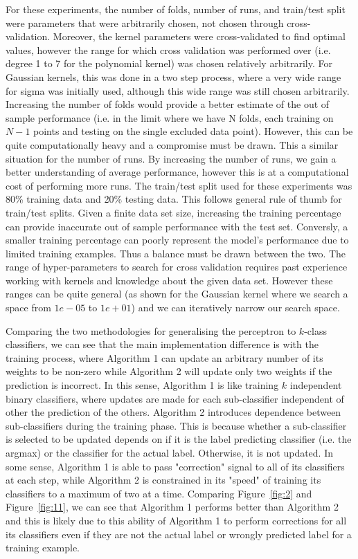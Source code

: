 \documentclass[12pt]{article}
\begin{document}
For these experiments, the number of folds, number of runs, and train/test split were parameters that were arbitrarily chosen, not chosen through cross-validation. Moreover, the kernel parameters were cross-validated to find optimal values, however the range for which cross validation was performed over (i.e. degree 1 to 7 for the polynomial kernel) was chosen relatively arbitrarily. For Gaussian kernels, this was done in a two step process, where a very wide range for sigma was initially used, although this wide range was still chosen arbitrarily. Increasing the number of folds would provide a better estimate of the out of sample performance (i.e. in the limit where we have N folds, each training on $N-1$ points and testing on the single excluded data point). However, this can be quite computationally heavy and a compromise must be drawn. This a similar situation for the number of runs. By increasing the number of runs, we gain a better understanding of average performance, however this is at a computational cost of performing more runs. The train/test split used for these experiments was 80\% training data and 20\% testing data. This follows general rule of thumb for train/test splits. Given a finite data set size, increasing the training percentage can provide inaccurate out of sample performance with the test set. Conversly, a smaller training percentage can poorly represent the model's performance due to limited training examples. Thus a balance must be drawn between the two. The range of hyper-parameters to search for cross validation requires past experience working with kernels and knowledge about the given data set. However these ranges can be quite general (as shown for the Gaussian kernel where we search a space from $1e-05$ to $1e+01$) and we can iteratively narrow our search space.

Comparing the two methodologies for generalising the perceptron to $k$-class classifiers, we can see that the main implementation difference is with the training process, where Algorithm 1 can update an arbitrary number of its weights to be non-zero while Algorithm 2 will update only two weights if the prediction is incorrect. In this sense, Algorithm 1 is like training $k$ independent binary classifiers, where updates are made for each sub-classifier independent of other the prediction of the others. Algorithm 2 introduces dependence between sub-classifiers during the training phase. This is because whether a sub-classifier is selected to be updated depends on if it is the label predicting classifier (i.e. the argmax) or the classifier for the actual label. Otherwise, it is not updated. In some sense, Algorithm 1 is able to pass "correction" signal to all of its classifiers at each step, while Algorithm 2 is constrained in its "speed" of training its classifiers to a maximum of two at a time. Comparing Figure~\ref{fig:2} and Figure~\ref{fig:11}, we can see that Algorithm 1 performs better than Algorithm 2 and this is likely due to this ability of Algorithm 1 to perform corrections for all its classifiers even if they are not the actual label or wrongly predicted label for a training example.
\end{document}
